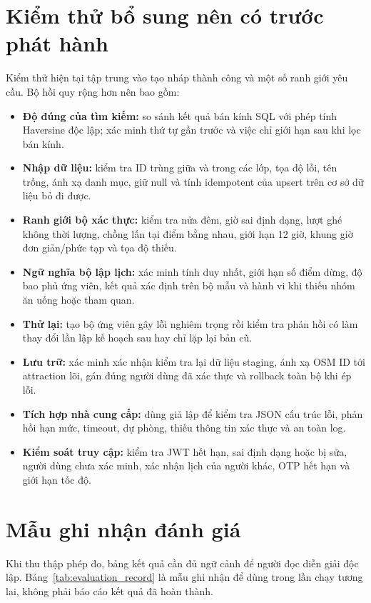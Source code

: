 \section{Kiểm thử bổ sung nên có trước phát hành}

Kiểm thử hiện tại tập trung vào tạo nháp thành công và một số ranh giới yêu cầu. Bộ hồi quy rộng hơn nên bao gồm:
\begin{itemize}[leftmargin=1.8em,itemsep=3pt]
    \item \textbf{Độ đúng của tìm kiếm:} so sánh kết quả bán kính SQL với phép tính Haversine độc lập; xác minh thứ tự gần trước và việc chỉ giới hạn sau khi lọc bán kính.
    \item \textbf{Nhập dữ liệu:} kiểm tra ID trùng giữa và trong các lớp, tọa độ lỗi, tên trống, ánh xạ danh mục, giữ null và tính idempotent của upsert trên cơ sở dữ liệu bỏ đi được.
    \item \textbf{Ranh giới bộ xác thực:} kiểm tra nửa đêm, giờ sai định dạng, lượt ghé không thời lượng, chồng lấn tại điểm bằng nhau, giới hạn 12 giờ, khung giờ đơn giản/phức tạp và tọa độ thiếu.
    \item \textbf{Ngữ nghĩa bộ lập lịch:} xác minh tính duy nhất, giới hạn số điểm dừng, độ bao phủ ứng viên, kết quả xác định trên bộ mẫu và hành vi khi thiếu nhóm ăn uống hoặc tham quan.
    \item \textbf{Thử lại:} tạo bộ ứng viên gây lỗi nghiêm trọng rồi kiểm tra phản hồi có làm thay đổi lần lập kế hoạch sau hay chỉ lặp lại bản cũ.
    \item \textbf{Lưu trữ:} xác minh xác nhận kiểm tra lại dữ liệu staging, ánh xạ OSM ID tới attraction lõi, gán đúng người dùng đã xác thực và rollback toàn bộ khi ép lỗi.
    \item \textbf{Tích hợp nhà cung cấp:} dùng giả lập để kiểm tra JSON cấu trúc lỗi, phản hồi hạn mức, timeout, dự phòng, thiếu thông tin xác thực và an toàn log.
    \item \textbf{Kiểm soát truy cập:} kiểm tra JWT hết hạn, sai định dạng hoặc bị sửa, người dùng chưa xác minh, xác nhận lịch của người khác, OTP hết hạn và giới hạn tốc độ.
\end{itemize}

\section{Mẫu ghi nhận đánh giá}

Khi thu thập phép đo, bảng kết quả cần đủ ngữ cảnh để người đọc diễn giải độc lập. Bảng~\ref{tab:evaluation_record} là mẫu ghi nhận để dùng trong lần chạy tương lai, không phải báo cáo kết quả đã hoàn thành.

